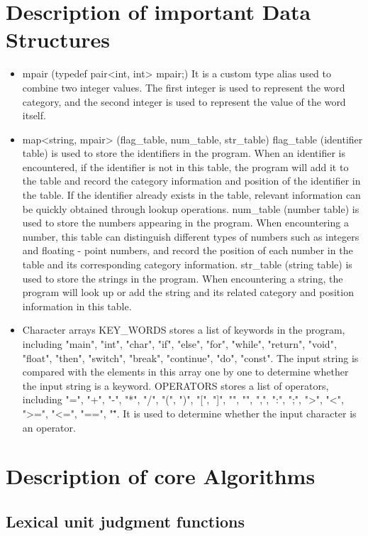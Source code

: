 \documentclass[a4paper,12pt]{article}
\begin{document}
\section{Description of important Data Structures}
\begin{itemize}
    \item mpair (typedef pair<int, int> mpair;)
    It is a custom type alias used to combine two integer values. The first integer is used to represent the word category, and the second integer is used to represent the value of the word itself.
    \item map<string, mpair> (flag\_table, num\_table, str\_table)
    flag\_table (identifier table) is used to store the identifiers in the program. When an identifier is encountered, if the identifier is not in this table, the program will add it to the table and record the category information and position of the identifier in the table. If the identifier already exists in the table, relevant information can be quickly obtained through lookup operations.
    num\_table (number table) is used to store the numbers appearing in the program. When encountering a number, this table can distinguish different types of numbers such as integers and floating - point numbers, and record the position of each number in the table and its corresponding category information.
    str\_table (string table) is used to store the strings in the program. When encountering a string, the program will look up or add the string and its related category and position information in this table.
    \item Character arrays
    KEY\_WORDS stores a list of keywords in the program, including "main", "int", "char", "if", "else", "for", "while", "return", "void", "float", "then", "switch", "break", "continue", "do", "const". The input string is compared with the elements in this array one by one to determine whether the input string is a keyword.
    OPERATORS stores a list of operators, including "=", "+", "-", "*", "/", "(", ")", "[", "]", "{", "}", ",", ":", ";", ">", "<", ">=", "<=", "==", "\"". It is used to determine whether the input character is an operator.
\end{itemize}

\section{Description of core Algorithms}
\subsection{Lexical unit judgment functions}
\end{document}

